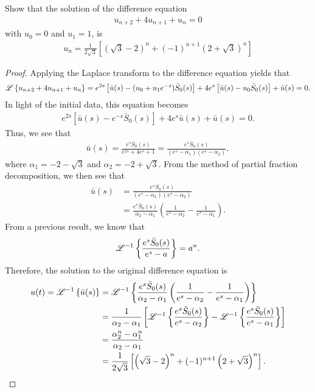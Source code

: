 \begin{problem}{4.36}
  Show that the solution of the difference equation
  \begin{align*}
    u_{n+2} + 4 u_{n+1} + u_n = 0
  \end{align*}
  with $u_0 = 0$ and $u_1 = 1$, is
  \begin{align*}
    u_n = \frac{1}{2\sqrt{3}}\left[\left(\sqrt{3}-2\right)^n + (-1)^{n+1} \left(2 + \sqrt{3}\right)^n\right]
  \end{align*}
\end{problem}

\begin{proof}
  Applying the Laplace transform to the difference equation yields that
  \begin{align*}
    \mathscr{L}\left\{ {u_{n+2} + 4 u_{n+1} + u_n} \right\} = e^{2s}\left[\bar{u}(s)-(u_0 + u_1e^{-s})\bar{S}_0(s)\right] + 4e^s\left[\bar{u}(s)-u_0 \bar{S}_0(s)\right] + \bar{u}(s) = 0.
  \end{align*}
  In light of the initial data, this equation becomes
  \begin{align*}
    e^{2s}\left[\bar{u}(s)-e^{-s}\bar{S}_0(s)\right] + 4e^s\bar{u}(s) + \bar{u}(s) = 0.
  \end{align*}
  Thus, we see that
  \begin{align*}
    \bar{u}(s) = \frac{e^{s}\bar{S}_0(s)}{e^{2s}+4e^{s}+1} = \frac{e^{s}\bar{S}_0(s)}{(e^s - \alpha_1)(e^s - \alpha_2)},
  \end{align*}
  where $\alpha_1 = -2 - \sqrt{3}$ and $\alpha_2 = -2 + \sqrt{3}$. From the method of partial fraction decomposition, we then see
  that
  \begin{align*}
    \bar{u}(s) &= \frac{e^{s}\bar{S}_0(s)}{(e^s - \alpha_1)(e^s - \alpha_2)} \\
    &= \frac{e^{s}\bar{S}_0(s)}{\alpha_2 - \alpha_1}\left(\frac{1}{e^s - \alpha_2} - \frac{1}{e^s-\alpha_1}\right).
  \end{align*}
  From a previous result, we know that
  \begin{align*}
    \mathscr{L}^{-1}\left\{ {\frac{e^{s}\bar{S}_0(s)}{e^s - a}} \right\} = a^n.
  \end{align*}
  Therefore, the solution to the original difference equation is
  \begin{align*}
    u(t) = \mathscr{L}^{-1}\left\{ {\bar{u}(s)} \right\} &= \mathscr{L}^{-1}\left\{ {\frac{e^{s}\bar{S}_0(s)}{\alpha_2 - \alpha_1}\left(\frac{1}{e^s - \alpha_2} - \frac{1}{e^s-\alpha_1}\right)} \right\} \\
    &= \frac{1}{\alpha_2 - \alpha_1}\left[\mathscr{L}^{-1}\left\{ {\frac{e^{s}\bar{S}_0(s)}{e^s - \alpha_2}} \right\} - \mathscr{L}^{-1}\left\{ {\frac{e^{s}\bar{S}_0(s)}{e^s - \alpha_1}} \right\}\right] \\
    &= \frac{\alpha_2^n - \alpha_1^n}{\alpha_2 - \alpha_1}\\
    &= \frac{1}{2\sqrt{3}}\left[\left(\sqrt{3}-2\right)^n + (-1)^{n+1} \left(2 + \sqrt{3}\right)^n\right].
  \end{align*}


\end{proof}
\newpage
